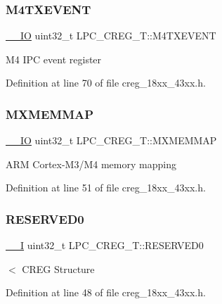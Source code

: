 \subsubsection{\texorpdfstring{M4\+T\+X\+E\+V\+E\+NT}{M4TXEVENT}}
{\footnotesize\ttfamily \hyperlink{core__sc300_8h_aec43007d9998a0a0e01faede4133d6be}{\+\_\+\+\_\+\+IO} uint32\+\_\+t L\+P\+C\+\_\+\+C\+R\+E\+G\+\_\+\+T\+::\+M4\+T\+X\+E\+V\+E\+NT}

M4 I\+PC event register 

Definition at line 70 of file creg\+\_\+18xx\+\_\+43xx.\+h.

\mbox{\label{struct_l_p_c___c_r_e_g___t_ab42d8c1a520a14805214b436e62a7258}} 
\subsubsection{\texorpdfstring{M\+X\+M\+E\+M\+M\+AP}{MXMEMMAP}}
{\footnotesize\ttfamily \hyperlink{core__sc300_8h_aec43007d9998a0a0e01faede4133d6be}{\+\_\+\+\_\+\+IO} uint32\+\_\+t L\+P\+C\+\_\+\+C\+R\+E\+G\+\_\+\+T\+::\+M\+X\+M\+E\+M\+M\+AP}

A\+RM Cortex-\/\+M3/\+M4 memory mapping 

Definition at line 51 of file creg\+\_\+18xx\+\_\+43xx.\+h.

\mbox{\label{struct_l_p_c___c_r_e_g___t_a8ff8e0b7b7fdcafcac9d7b3eed2a6887}} 
\subsubsection{\texorpdfstring{R\+E\+S\+E\+R\+V\+E\+D0}{RESERVED0}}
{\footnotesize\ttfamily \hyperlink{core__sc300_8h_af63697ed9952cc71e1225efe205f6cd3}{\+\_\+\+\_\+I} uint32\+\_\+t L\+P\+C\+\_\+\+C\+R\+E\+G\+\_\+\+T\+::\+R\+E\+S\+E\+R\+V\+E\+D0}

$<$ C\+R\+EG Structure 

Definition at line 48 of file creg\+\_\+18xx\+\_\+43xx.\+h.


